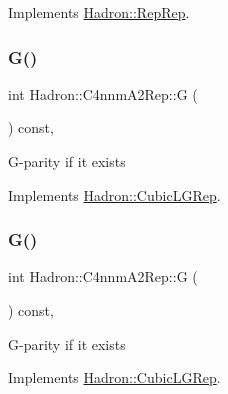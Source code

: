 Implements \mbox{\hyperlink{structHadron_1_1RepRep_a92c8802e5ed7afd7da43ccfd5b7cd92b}{Hadron\+::\+Rep\+Rep}}.

\mbox{\label{structHadron_1_1C4nnmA2Rep_a7ad7f57cdcdb2bcb504ebb43d1990471}} 
\subsubsection{\texorpdfstring{G()}{G()}\hspace{0.1cm}{\footnotesize\ttfamily [1/3]}}
{\footnotesize\ttfamily int Hadron\+::\+C4nnm\+A2\+Rep\+::G (\begin{DoxyParamCaption}{ }\end{DoxyParamCaption}) const\hspace{0.3cm}{\ttfamily [inline]}, {\ttfamily [virtual]}}

G-\/parity if it exists 

Implements \mbox{\hyperlink{structHadron_1_1CubicLGRep_ace26f7b2d55e3a668a14cb9026da5231}{Hadron\+::\+Cubic\+L\+G\+Rep}}.

\mbox{\label{structHadron_1_1C4nnmA2Rep_a7ad7f57cdcdb2bcb504ebb43d1990471}} 
\subsubsection{\texorpdfstring{G()}{G()}\hspace{0.1cm}{\footnotesize\ttfamily [2/3]}}
{\footnotesize\ttfamily int Hadron\+::\+C4nnm\+A2\+Rep\+::G (\begin{DoxyParamCaption}{ }\end{DoxyParamCaption}) const\hspace{0.3cm}{\ttfamily [inline]}, {\ttfamily [virtual]}}

G-\/parity if it exists 

Implements \mbox{\hyperlink{structHadron_1_1CubicLGRep_ace26f7b2d55e3a668a14cb9026da5231}{Hadron\+::\+Cubic\+L\+G\+Rep}}.

\mbox{\label{structHadron_1_1C4nnmA2Rep_a7ad7f57cdcdb2bcb504ebb43d1990471}} 
